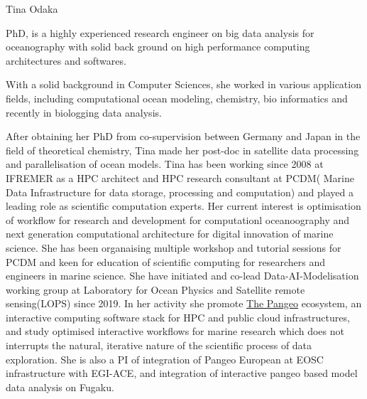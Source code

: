 \begin{participant}[gender=female]{Tina Odaka}

  \medskip PhD, is a highly experienced research engineer on big data analysis for oceanography with solid back ground on high performance computing architectures and softwares.  

  With a solid background in Computer Sciences, she worked in various application fields, including computational ocean modeling, chemistry, bio informatics and recently in biologging data analysis.

After obtaining her PhD from co-supervision between Germany and Japan in the field of theoretical chemistry, Tina made her post-doc in satellite data processing and parallelisation of ocean models.  Tina has been working since 2008 at IFREMER as a HPC architect and HPC research consultant at PCDM( Marine Data Infrastructure for data storage, processing and computation) and played a leading role as scientific computation experts. 
  Her current interest is optimisation of workflow for research and development for computationl oceanoography and next generation computational architecture for digital innovation of marine science.  
 She has been organaising multiple workshop and tutorial sessions for PCDM and keen for education of scientific computing for researchers and engineers in marine science.  
 She have initiated and co-lead Data-AI-Modelisation working group at Laboratory for Ocean Physics and Satellite remote sensing(LOPS) since 2019. In her activity she promote 
\href{https://pangeo.io/}{The Pangeo}  ecosystem, an interactive computing software stack for HPC and public cloud infrastructures, and study optimised interactive workflows for marine research which does not interrupts the natural, iterative nature of the scientific process of data exploration. 
She is also a PI of integration of Pangeo European at EOSC infrastructure with EGI-ACE, and integration of interactive pangeo based model data analysis on Fugaku.  

   
\end{participant}

